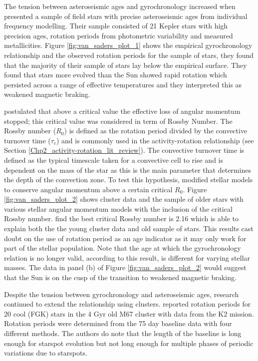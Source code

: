 The tension between asteroseismic ages and gyrochronology increased when \citet{van_Saders_etal_2016} presented a sample of field stars with precise asteroseismic ages from individual frequency modelling. Their sample consisted of 21 Kepler stars with high precision ages, rotation periods from photometric variability and measured metallicities. Figure \ref{fig:van_saders_plot_1} shows the empirical gyrochronology relationship and the observed rotation periods for the \citet{van_Saders_etal_2016} sample of stars, they found that the majority of their sample of stars lay below the empirical surface. They found that stars more evolved than the Sun showed rapid rotation which persisted across a range of effective temperatures and they interpreted this as weakened magnetic braking.

\citet{van_Saders_etal_2016} postulated that above a critical value the effective loss of angular momentum stopped; this critical value was considered in term of Rossby Number. The Rossby number ($R_{0}$) is defined as the rotation period divided by the convective turnover time ($\tau_{c}$) and is commonly used in the activity-rotation relationship (see Section \ref{Chp2_activity-rotation_lit_review}). The convective turnover time is defined as the typical timescale taken for a convective cell to rise and is dependent on the mass of the star as this is the main parameter that determines the depth of the convection zone. To test this hypothesis, \citet{van_Saders_etal_2016} modified stellar models to conserve angular momentum above a certain critical $R_{0}$. Figure \ref{fig:van_saders_plot_2} shows cluster data and the sample of older stars with various stellar angular momentum models with the inclusion of the critical Rossby number. \citet{van_Saders_etal_2016} find the best critical Rossby number is 2.16 which is able to explain both the the young cluster data and old sample of stars. This results cast doubt on the use of rotation period as an age indicator as it may only work for part of the stellar population. Note that the age at which the gyrochronology relation is no longer valid, according to this result, is different for varying stellar masses. The data in panel (b) of Figure \ref{fig:van_saders_plot_2} would suggest that the Sun is on the cusp of the transition to weakened magnetic braking.

Despite the tension between gyrochronology and asteroseismic ages, research continued to extend the relationship using clusters. \citet{Barnes_etal_2016} reported rotation periods for 20 cool (FGK) stars in the 4 Gyr old M67 cluster with data from the K2 mission. Rotation periods were determined from the 75 day baseline data with four different methods. The authors do note that the length of the baseline is long enough for starspot evolution but not long enough for multiple phases of periodic variations due to starspots.

